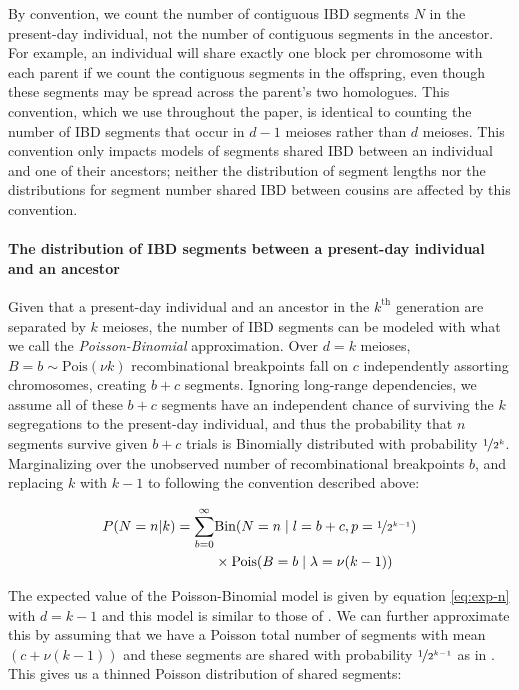 \documentclass[9pt,twocolumn,twoside]{gsajnl}
\begin{document}
By convention, we count the number of contiguous IBD segments $N$ in the
present-day individual, not the number of contiguous segments in the ancestor.
For example, an individual will share exactly one block per chromosome with
each parent if we count the contiguous segments in the offspring, even though
these segments may be spread across the parent's two homologues. This
convention, which we use throughout the paper, is identical to counting the
number of IBD segments that occur in $d-1$ meioses rather than $d$ meioses.
This convention only impacts models of segments shared IBD between an
individual and one of their ancestors; neither the distribution of segment
lengths nor the distributions for segment number shared IBD between cousins are
affected by this convention.

\paragraph{The distribution of IBD segments between a present-day individual
and an ancestor} 
\label{sec:auto-dist-ibd-seg}

Given that a present-day individual and an ancestor in the $k^\text{th}$
generation are separated by $k$ meioses, the number of IBD segments can be
modeled with what we call the \emph{Poisson-Binomial} approximation. Over $d=k$
meioses, $B=b \sim \text{Pois}(\nu k)$ recombinational breakpoints fall on $c$
independently assorting chromosomes, creating $b + c$ segments. Ignoring
long-range dependencies, we assume all of these $b+c$ segments have an
independent chance of surviving the $k$ segregations to the present-day
individual, and thus the probability that $n$ segments survive given $b+c$
trials is Binomially distributed with probability $\nicefrac{1}{2^k}$.
Marginalizing over the unobserved number of recombinational breakpoints $b$,
and replacing $k$ with $k-1$ to following the convention described above:

\begin{align}
  P(N=n | k) = \sum_{b=0}^\infty &\text{Bin}(N=n \;|\; l=b+c,
p=\nicefrac{1}{2^{k-1}}) \nonumber \\ 
&\times \text{Pois}(B=b \;|\; \lambda=\nu (k-1)) 
\end{align}

The expected value of the Poisson-Binomial model is given by equation
\eqref{eq:exp-n} with $d=k-1$ and this model is similar to those of
\citet{thomas:1994hg,Donnelly:1983fi}. We can further approximate this by
assuming that we have a Poisson total number of segments with mean $(c +
\nu(k-1))$ and these segments are shared with probability
$\nicefrac{1}{2^{k-1}}$ as in \citet{huff2011maximum}. This gives us a
thinned Poisson distribution of shared segments:
\end{document}
